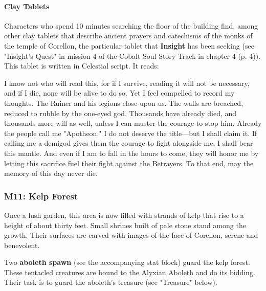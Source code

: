 \documentclass[a4paper, 11pt, bg=full, twocolumn, nooutline]{dndbook}
\begin{document}
\paragraph{Clay Tablets}

Characters who spend 10 minutes searching the floor of the building find, among other clay tablets that describe ancient prayers and catechisms of the monks of the temple of Corellon, the particular tablet that \textbf{Insight} has been seeking (see "Insight's Quest" in mission 4 of the Cobalt Soul Story Track in chapter 4 (p. 4)). This tablet is written in Celestial script. It reads:

\begin{DndReadAloud}
I know not who will read this, for if I survive, reading it will not be necessary, and if I die, none will be alive to do so. Yet I feel compelled to record my thoughts. The Ruiner and his legions close upon us. The walls are breached, reduced to rubble by the one-eyed god. Thousands have already died, and thousands more will as well, unless I can muster the courage to stop him.
Already the people call me "Apotheon." I do not deserve the title---but I shall claim it. If calling me a demigod gives them the courage to fight alongside me, I shall bear this mantle. And even if I am to fall in the hours to come, they will honor me by letting this sacrifice fuel their fight against the Betrayers. To that end, may the memory of this day never die.
\end{DndReadAloud}

\subsubsection{M11: Kelp Forest}


\begin{DndReadAloud}
Once a lush garden, this area is now filled with strands of kelp that rise to a height of about thirty feet. Small shrines built of pale stone stand among the growth. Their surfaces are carved with images of the face of Corellon, serene and benevolent.
\end{DndReadAloud}

Two \textbf{aboleth spawn} (see the accompanying stat block) guard the kelp forest. These tentacled creatures are bound to the Alyxian Aboleth and do its bidding. Their task is to guard the aboleth's treasure (see "Treasure" below).
\end{document}
